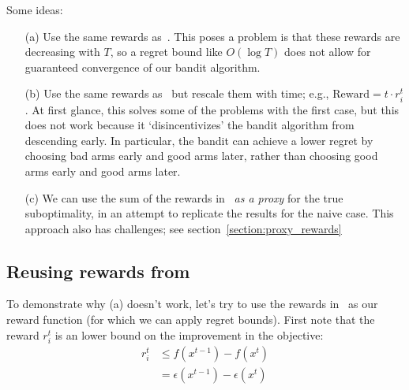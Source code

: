 \documentclass[letterpaper]{article}
\begin{document}
Some ideas:
\begin{enumerate}
    \item[(a)] Use the same rewards as~\cite{salehi2018coordinate}. This poses a problem is that these rewards are decreasing with $T$, so a regret bound like $O(\log T)$ does not allow for guaranteed convergence of our bandit algorithm.
    \item[(b)] Use the same rewards as~\cite{salehi2018coordinate} but rescale them with time; e.g., $\text{Reward} = t\cdot r_i^t$. At first glance, this solves some of the problems with the first case, but this does not work because it `disincentivizes' the bandit algorithm from descending early. In particular, the bandit can achieve a lower regret by choosing bad arms early and good arms later, rather than choosing good arms early and good arms later.
    \item[(c)] We can use the sum of the rewards in~\cite{salehi2018coordinate} \emph{as a proxy} for the true suboptimality, in an attempt to replicate the results for the naive case. This approach also has challenges; see section~\ref{section:proxy_rewards}
\end{enumerate}

\subsection{Reusing rewards from~\cite{salehi2018coordinate}}
\label{section:reusing_rewards}
To demonstrate why (a) doesn't work, let's try to use the rewards in~\cite{salehi2018coordinate} as our reward function (for which we can apply regret bounds). First note that the reward $r_i^t$ is an lower bound on the improvement in the objective:
\begin{align}
    r_i^t &\leq f(x^{t-1}) - f(x^t) \\
    &=\epsilon(x^{t-1}) - \epsilon(x^t)
\end{align}
\end{document}
